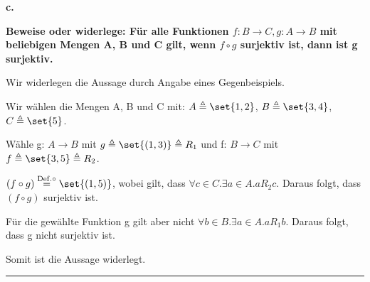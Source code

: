 \documentclass[10pt,leqno ]{article}
\DeclarePairedDelimiter\set\{\}
\newcommand\customeq[1]{\overset{\mathrm{#1}}{=}}
\theoremstyle{definition}
\newenvironment{solution}[1][L]{\begin{doublespace}\textbf{#1.}\quad }{\ \rule{0.5em}{0.5em}\end{doublespace}}
\begin{document}
\begin{solution}[c]

\textbf{Beweise oder widerlege: Für alle Funktionen \(f: B \rightarrow C, g: A \rightarrow B\) mit beliebigen Mengen A, B und C gilt, wenn \(f \circ g\) surjektiv ist, dann ist g surjektiv.}

Wir widerlegen die Aussage durch Angabe eines Gegenbeispiels.

Wir wählen die Mengen A, B und C mit: \(A \triangleq \set{1,2}\), \(B \triangleq \set{3,4}\), \(C \triangleq \set{5}\).

Wähle g: \(A \rightarrow B\) mit \(g \triangleq \set{(1,3)} \triangleq R_1\) und f: \(B \rightarrow C\) mit \(f \triangleq \set{3,5} \triangleq R_2\).

\((f \circ g) \customeq{Def. \circ} \set{(1,5)}\), wobei gilt, dass \(\forall c \in C . \exists a \in A . aR_2c\). Daraus folgt, dass \((f \circ g)\) surjektiv ist.

Für die gewählte Funktion g gilt aber nicht \(\forall b \in B . \exists a \in A . aR_1b\). Daraus folgt, dass g nicht surjektiv ist.

Somit ist die Aussage widerlegt.
\end{solution}
\end{document}

